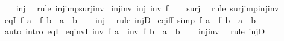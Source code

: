 \begin{isabellebody}
%
\isadelimproof
\ \ %
\endisadelimproof
%
\isatagproof
{}\isamarkupfalse%
\ inj\ \isamarkupfalse%
\ {\isacharparenleft}{\kern0pt}rule\ inj{\isacharunderscore}{\kern0pt}imp{\isacharunderscore}{\kern0pt}surj{\isacharunderscore}{\kern0pt}inv{\isacharparenright}{\kern0pt}%
\endisatagproof
{\isafoldproof}%
%
\isadelimproof
\isanewline
%
\endisadelimproof
\isanewline
{}\isamarkupfalse%
\ inj{\isacharunderscore}{\kern0pt}inv{\isacharcolon}{\kern0pt}\ {\isachardoublequoteopen}inj\ {\isacharparenleft}{\kern0pt}inv\ f{\isacharparenright}{\kern0pt}{\isachardoublequoteclose}\isanewline
%
\isadelimproof
\ \ %
\endisadelimproof
%
\isatagproof
{}\isamarkupfalse%
\ surj\ \isamarkupfalse%
\ {\isacharparenleft}{\kern0pt}rule\ surj{\isacharunderscore}{\kern0pt}imp{\isacharunderscore}{\kern0pt}inj{\isacharunderscore}{\kern0pt}inv{\isacharparenright}{\kern0pt}%
\endisatagproof
{\isafoldproof}%
%
\isadelimproof
\isanewline
%
\endisadelimproof
\isanewline
{}\isamarkupfalse%
\ eqI{\isacharcolon}{\kern0pt}\ {\isachardoublequoteopen}f\ a\ {\isacharequal}{\kern0pt}\ f\ b\ {\isasymLongrightarrow}\ a\ {\isacharequal}{\kern0pt}\ b{\isachardoublequoteclose}\isanewline
%
\isadelimproof
\ \ %
\endisadelimproof
%
\isatagproof
{}\isamarkupfalse%
\ inj\ \isamarkupfalse%
\ {\isacharparenleft}{\kern0pt}rule\ injD{\isacharparenright}{\kern0pt}%
\endisatagproof
{\isafoldproof}%
%
\isadelimproof
\isanewline
%
\endisadelimproof
\isanewline
{}\isamarkupfalse%
\ eq{\isacharunderscore}{\kern0pt}iff\ {\isacharbrackleft}{\kern0pt}simp{\isacharbrackright}{\kern0pt}{\isacharcolon}{\kern0pt}\ {\isachardoublequoteopen}f\ a\ {\isacharequal}{\kern0pt}\ f\ b\ {\isasymlongleftrightarrow}\ a\ {\isacharequal}{\kern0pt}\ b{\isachardoublequoteclose}\isanewline
%
\isadelimproof
\ \ %
\endisadelimproof
%
\isatagproof
{}\isamarkupfalse%
\ {\isacharparenleft}{\kern0pt}auto\ intro{\isacharcolon}{\kern0pt}\ eqI{\isacharparenright}{\kern0pt}%
\endisatagproof
{\isafoldproof}%
%
\isadelimproof
\isanewline
%
\endisadelimproof
\isanewline
{}\isamarkupfalse%
\ eq{\isacharunderscore}{\kern0pt}invI{\isacharcolon}{\kern0pt}\ {\isachardoublequoteopen}inv\ f\ a\ {\isacharequal}{\kern0pt}\ inv\ f\ b\ {\isasymLongrightarrow}\ a\ {\isacharequal}{\kern0pt}\ b{\isachardoublequoteclose}\isanewline
%
\isadelimproof
\ \ %
\endisadelimproof
%
\isatagproof
{}\isamarkupfalse%
\ inj{\isacharunderscore}{\kern0pt}inv\ \isamarkupfalse%
\ {\isacharparenleft}{\kern0pt}rule\ injD{\isacharparenright}{\kern0pt}%

\end{isabellebody}
